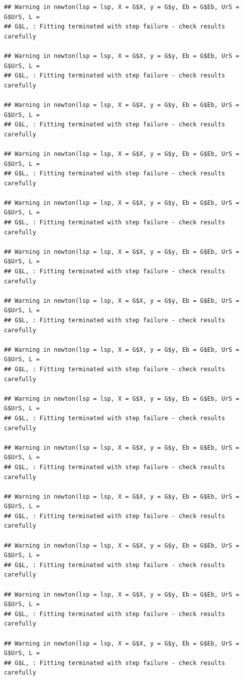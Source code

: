 \documentclass[]{book}
\theoremstyle{definition}
\theoremstyle{definition}
\theoremstyle{remark}
\begin{document}
\begin{verbatim}
## Warning in newton(lsp = lsp, X = G$X, y = G$y, Eb = G$Eb, UrS = G$UrS, L =
## G$L, : Fitting terminated with step failure - check results carefully

## Warning in newton(lsp = lsp, X = G$X, y = G$y, Eb = G$Eb, UrS = G$UrS, L =
## G$L, : Fitting terminated with step failure - check results carefully

## Warning in newton(lsp = lsp, X = G$X, y = G$y, Eb = G$Eb, UrS = G$UrS, L =
## G$L, : Fitting terminated with step failure - check results carefully

## Warning in newton(lsp = lsp, X = G$X, y = G$y, Eb = G$Eb, UrS = G$UrS, L =
## G$L, : Fitting terminated with step failure - check results carefully

## Warning in newton(lsp = lsp, X = G$X, y = G$y, Eb = G$Eb, UrS = G$UrS, L =
## G$L, : Fitting terminated with step failure - check results carefully

## Warning in newton(lsp = lsp, X = G$X, y = G$y, Eb = G$Eb, UrS = G$UrS, L =
## G$L, : Fitting terminated with step failure - check results carefully

## Warning in newton(lsp = lsp, X = G$X, y = G$y, Eb = G$Eb, UrS = G$UrS, L =
## G$L, : Fitting terminated with step failure - check results carefully

## Warning in newton(lsp = lsp, X = G$X, y = G$y, Eb = G$Eb, UrS = G$UrS, L =
## G$L, : Fitting terminated with step failure - check results carefully

## Warning in newton(lsp = lsp, X = G$X, y = G$y, Eb = G$Eb, UrS = G$UrS, L =
## G$L, : Fitting terminated with step failure - check results carefully

## Warning in newton(lsp = lsp, X = G$X, y = G$y, Eb = G$Eb, UrS = G$UrS, L =
## G$L, : Fitting terminated with step failure - check results carefully

## Warning in newton(lsp = lsp, X = G$X, y = G$y, Eb = G$Eb, UrS = G$UrS, L =
## G$L, : Fitting terminated with step failure - check results carefully

## Warning in newton(lsp = lsp, X = G$X, y = G$y, Eb = G$Eb, UrS = G$UrS, L =
## G$L, : Fitting terminated with step failure - check results carefully

## Warning in newton(lsp = lsp, X = G$X, y = G$y, Eb = G$Eb, UrS = G$UrS, L =
## G$L, : Fitting terminated with step failure - check results carefully

## Warning in newton(lsp = lsp, X = G$X, y = G$y, Eb = G$Eb, UrS = G$UrS, L =
## G$L, : Fitting terminated with step failure - check results carefully


\end{verbatim}
\end{document}
